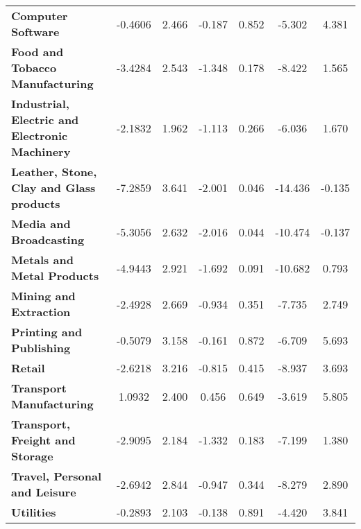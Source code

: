 \documentclass[ 11pt]{article}
\begin{document}
\begin{center}
\begin{longtable}{lcccccc}
\textbf{Computer Software}                                 &      -0.4606  &        2.466     &    -0.187  &         0.852        &       -5.302    &        4.381     \\
\textbf{Food and Tobacco Manufacturing}                    &      -3.4284  &        2.543     &    -1.348  &         0.178        &       -8.422    &        1.565     \\
\textbf{Industrial, Electric and Electronic Machinery}     &      -2.1832  &        1.962     &    -1.113  &         0.266        &       -6.036    &        1.670     \\
\textbf{Leather, Stone, Clay and Glass products}           &      -7.2859  &        3.641     &    -2.001  &         0.046        &      -14.436    &       -0.135     \\
\textbf{Media and Broadcasting}                            &      -5.3056  &        2.632     &    -2.016  &         0.044        &      -10.474    &       -0.137     \\
\textbf{Metals and Metal Products}                         &      -4.9443  &        2.921     &    -1.692  &         0.091        &      -10.682    &        0.793     \\
\textbf{Mining and Extraction}                             &      -2.4928  &        2.669     &    -0.934  &         0.351        &       -7.735    &        2.749     \\
\textbf{Printing and Publishing}                           &      -0.5079  &        3.158     &    -0.161  &         0.872        &       -6.709    &        5.693     \\
\textbf{Retail}                                            &      -2.6218  &        3.216     &    -0.815  &         0.415        &       -8.937    &        3.693     \\
\textbf{Transport Manufacturing}                           &       1.0932  &        2.400     &     0.456  &         0.649        &       -3.619    &        5.805     \\
\textbf{Transport, Freight and Storage}                    &      -2.9095  &        2.184     &    -1.332  &         0.183        &       -7.199    &        1.380     \\
\textbf{Travel, Personal and Leisure}                      &      -2.6942  &        2.844     &    -0.947  &         0.344        &       -8.279    &        2.890     \\
\textbf{Utilities}                                         &      -0.2893  &        2.103     &    -0.138  &         0.891        &       -4.420    &        3.841     \\

\end{longtable}
\end{center}
\end{document}
